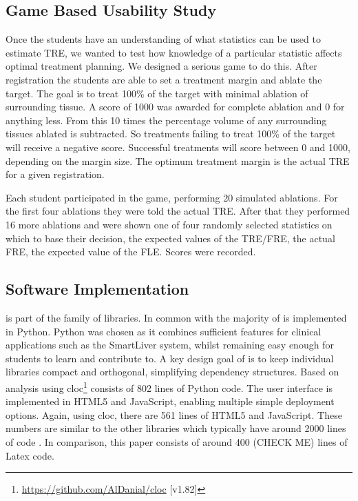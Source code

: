 \subsection{Game Based Usability Study}
\label{sec:game_method}
Once the students have an understanding of what statistics can be used to estimate \gls{TRE}, we wanted to test 
how knowledge of a particular statistic affects optimal treatment planning. We designed a serious game to 
do this. After registration the students are able to set a treatment margin and ablate the target. The goal is 
to treat 100\% of the target with minimal ablation of surrounding tissue. A score of 1000 was awarded for complete ablation and 0 
for anything less. From this 10 times the percentage volume of any surrounding tissues ablated is subtracted. So 
treatments failing to treat 100\% of the target will receive a negative score. 
Successful treatments will score between 0 and 1000, depending on the margin size. The optimum treatment 
margin is the actual \gls{TRE} for a given registration.

Each student participated in the game, performing 20 simulated ablations. For the first four ablations they were told the 
actual \gls{TRE}. After that they performed 16 more ablations and were shown one of four randomly selected statistics on which to base their decision,
the expected values of the TRE/FRE, the actual FRE, the expected value of the FLE. Scores were recorded.

\subsection{Software Implementation}
\fred is part of the \sksurgery\cite{PMID:32436132} family of libraries. In common with \sksurgery the majority of \fred is implemented in Python. Python was chosen as it combines sufficient features for clinical
applications such as the SmartLiver system\cite{PMID:32780240}, whilst remaining easy enough for students to learn and contribute to. A key design goal of 
\sksurgery is to keep individual libraries compact and orthogonal\cite{pragmaticprog}, simplifying dependency structures. Based on 
analysis using cloc\footnote{\href{https://github.com/AlDanial/cloc}{https://github.com/AlDanial/cloc} [v1.82]} \fred consists of 802 lines of Python 
code. The user interface is implemented in HTML5 and JavaScript, enabling multiple simple deployment 
options. Again, using cloc, there are 561 lines of HTML5 and JavaScript. These numbers are similar to the other \sksurgery libraries which typically have around 2000 lines of code \cite{PMID:32436132}. In comparison, this paper consists of around 400 (CHECK ME) lines of Latex code.

